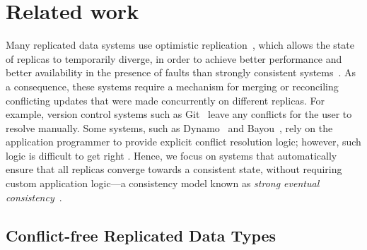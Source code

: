 \documentclass[sigconf]{acmart}
\begin{document}
\section{Related work}\label{sec:relwork}

Many replicated data systems use optimistic replication~\cite{Saito:2005jw}, which allows the state of replicas to temporarily diverge, in order to achieve better performance and better availability in the presence of faults than strongly consistent systems~\cite{Bailis:2014th,Gilbert:2002il}.
As a consequence, these systems require a mechanism for merging or reconciling conflicting updates that were made concurrently on different replicas.
For example, version control systems such as Git~\cite{Chacon:2014kr} leave any conflicts for the user to resolve manually.
Some systems, such as Dynamo~\cite{DeCandia:2007ui} and Bayou~\cite{Terry:1995dn}, rely on the application programmer to provide explicit conflict resolution logic; however, such logic is difficult to get right \cite{Bailis:2013jc,Burckhardt:2014hy,Gomes:2017gy}.
Hence, we focus on systems that automatically ensure that all replicas converge towards a consistent state, without requiring custom application logic---a consistency model known as \emph{strong eventual consistency}~\cite{Shapiro:2011un,Gomes:2017gy}.

\subsection{Conflict-free Replicated Data Types}
\end{document}
